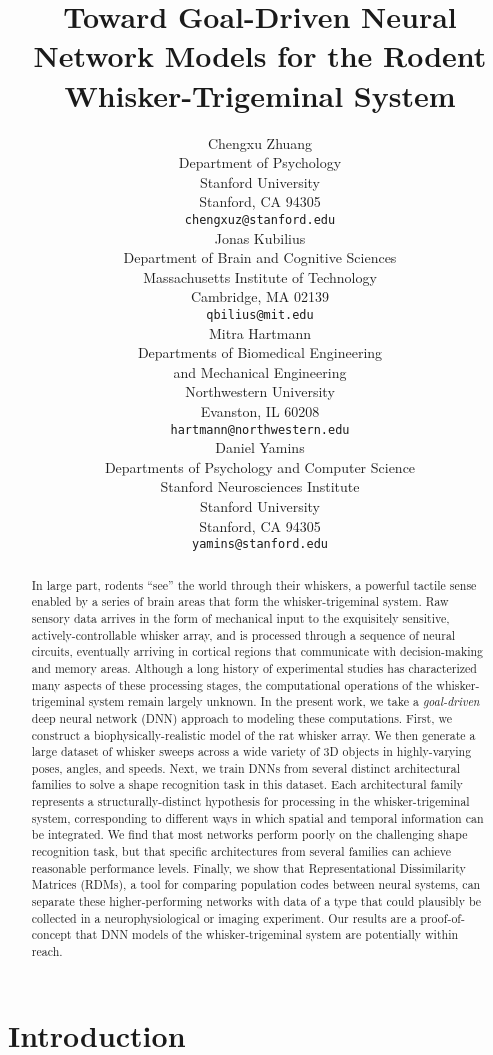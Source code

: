 \documentclass{article}
\title{Toward Goal-Driven Neural Network Models for the Rodent Whisker-Trigeminal System}
\author{
Chengxu Zhuang\\
Department of Psychology\\
Stanford University\\
Stanford, CA 94305 \\
\texttt{chengxuz@stanford.edu} \\
\And
Jonas Kubilius \\
Department of Brain and Cognitive Sciences \\
Massachusetts Institute of Technology \\
Cambridge, MA  02139\\
\texttt{qbilius@mit.edu} \\
\And
Mitra Hartmann \\
Departments of Biomedical Engineering \\
and Mechanical Engineering \\
Northwestern University \\
Evanston, IL  60208\\
\texttt{hartmann@northwestern.edu} \\
\And
Daniel Yamins \\
Departments of Psychology and Computer Science \\
Stanford Neurosciences Institute \\
Stanford University \\
Stanford, CA 94305 \\
\texttt{yamins@stanford.edu} \\
}
\begin{document}

\maketitle

\begin{abstract}
In large part, rodents ``see'' the world through their whiskers, a powerful tactile sense enabled by a series of brain areas that form the whisker-trigeminal system. 
Raw sensory data arrives in the form of mechanical input to the exquisitely sensitive, actively-controllable whisker array, and is processed through a sequence of neural circuits, eventually arriving in cortical regions that communicate with decision-making and memory areas.
Although a long history of experimental studies has characterized many aspects of these processing stages, the computational operations of the whisker-trigeminal system remain largely unknown.
In the present work, we take a \emph{goal-driven} deep neural network (DNN) approach to modeling these computations.
First, we construct a biophysically-realistic model of the rat whisker array.  
We then generate a large dataset of whisker sweeps across a wide variety of 3D objects in highly-varying poses, angles, and speeds.
Next, we train DNNs from several distinct architectural families to solve a shape recognition task in this dataset. 
Each architectural family represents a structurally-distinct hypothesis for processing in the whisker-trigeminal system,  corresponding to different ways in which spatial and temporal information can be integrated.
We find that most networks perform poorly on the challenging shape recognition task, but that specific architectures from several families can achieve reasonable performance levels.
Finally, we show that Representational Dissimilarity Matrices (RDMs), a tool for comparing population codes between neural systems, can separate these higher-performing networks with data of a type that could plausibly be collected in a neurophysiological or imaging experiment.
Our results are a proof-of-concept that DNN models of the whisker-trigeminal system are potentially within reach.
\end{abstract}


\section{Introduction} %
\vspace{-4mm}

\vspace{-3mm}
\end{document}
